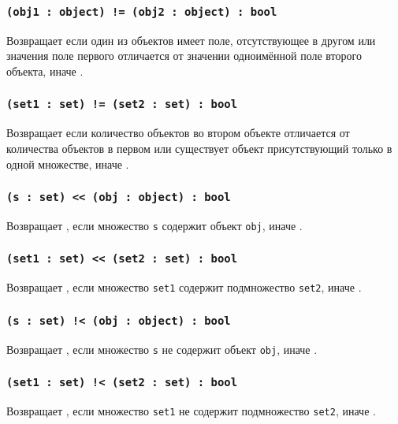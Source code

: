 \subsubsection{\texttt{(obj1 : object) != (obj2 : object) : bool}}

Возвращает \true{} если один из объектов имеет поле, отсутствующее в другом или значения поле первого отличается от значении одноимённой поле второго объекта, иначе \false{}.

\subsubsection{\texttt{(set1 : set) != (set2 : set) : bool}}

Возвращает \true{} если количество объектов во втором объекте отличается от количества объектов в первом или существует объект присутствующий только в одной множестве, иначе \false{}.

\subsubsection{\texttt{(s : set) << (obj : object) : bool}}

Возвращает \true{}, если множество \texttt{s} содержит объект \texttt{obj}, иначе \false{}.

\subsubsection{\texttt{(set1 : set) << (set2 : set) : bool}}

Возвращает \true, если множество \texttt{set1} содержит подмножество \texttt{set2}, иначе \false.

\subsubsection{\texttt{(s : set) !< (obj : object) : bool}}

Возвращает \true{}, если множество \texttt{s} не содержит объект \texttt{obj}, иначе \false{}.

\subsubsection{\texttt{(set1 : set) !< (set2 : set) : bool}}

Возвращает \true, если множество \texttt{set1} не содержит подмножество \texttt{set2}, иначе \false.

